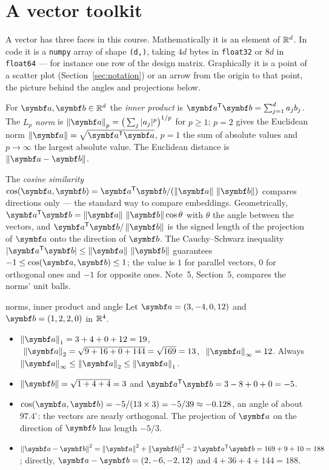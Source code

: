 \documentclass[11pt]{article}
\begin{document}
\section{A vector toolkit}\label{sec:vectors}

A vector has three faces in this course. Mathematically it is an element of $\mathbb{R}^d$. In code it is a \texttt{numpy}
array of shape \texttt{(d,)}, taking $4d$ bytes in \texttt{float32} or $8d$ in \texttt{float64} --- for instance one
row of the design matrix. Graphically it is a point of a scatter plot (Section~\ref{sec:notation}) or an arrow from
the origin to that point, the picture behind the angles and projections below.

For $\vect{a}, \vect{b} \in \R^d$ the \emph{inner product} is $\vect{a}\T\vect{b} = \sum_{j=1}^d a_j b_j$. The
\emph{$L_p$ norm} is $\norm{\vect{a}}_p = \big(\sum_j |a_j|^p\big)^{1/p}$ for $p \ge 1$; $p = 2$ gives the Euclidean
norm $\norm{\vect{a}} = \sqrt{\vect{a}\T\vect{a}}$, $p = 1$ the sum of absolute values and $p \to \infty$ the largest
absolute value. The Euclidean distance is $\norm{\vect{a} - \vect{b}}$.

The \emph{cosine similarity}
$\cos(\vect{a},\vect{b}) = \vect{a}\T\vect{b} / (\norm{\vect{a}}\,\norm{\vect{b}})$ compares directions only --- the
standard way to compare embeddings. Geometrically, $\vect{a}\T\vect{b} = \norm{\vect{a}}\,\norm{\vect{b}}\cos\theta$
with $\theta$ the angle between the vectors, and $\vect{a}\T\vect{b} / \norm{\vect{b}}$ is the signed length of the
projection of $\vect{a}$ onto the direction of $\vect{b}$. The Cauchy--Schwarz inequality $|\vect{a}\T\vect{b}| \le
\norm{\vect{a}}\,\norm{\vect{b}}$ guarantees $-1 \le \cos(\vect{a}, \vect{b}) \le 1$; the value is $1$ for parallel
vectors, $0$ for orthogonal ones and $-1$ for opposite ones. Note~5, Section~5, compares the norms' unit balls.

\begin{worked}{norms, inner product and angle}
Let $\vect{a} = (3, -4, 0, 12)$ and $\vect{b} = (1, 2, 2, 0)$ in $\mathbb{R}^4$.
\begin{itemize}
\item $\norm{\vect{a}}_1 = 3 + 4 + 0 + 12 = 19$, $\ \norm{\vect{a}}_2 = \sqrt{9 + 16 + 0 + 144} = \sqrt{169} = 13$,
$\ \norm{\vect{a}}_\infty = 12$. Always $\norm{\vect{a}}_\infty \le \norm{\vect{a}}_2 \le \norm{\vect{a}}_1$.
\item $\norm{\vect{b}} = \sqrt{1 + 4 + 4} = 3$ and $\vect{a}\T\vect{b} = 3 - 8 + 0 + 0 = -5$.
\item $\cos(\vect{a}, \vect{b}) = -5 / (13 \times 3) = -5/39 \approx -0.128$, an angle of about $97.4^\circ$: the
vectors are nearly orthogonal. The projection of $\vect{a}$ on the direction of $\vect{b}$ has length $-5/3$.
\item $\norm{\vect{a} - \vect{b}}^2 = \norm{\vect{a}}^2 + \norm{\vect{b}}^2 - 2\,\vect{a}\T\vect{b} = 169 + 9 + 10 =
188$; directly, $\vect{a} - \vect{b} = (2, -6, -2, 12)$ and $4 + 36 + 4 + 144 = 188$.
\end{itemize}
\end{worked}
\end{document}
